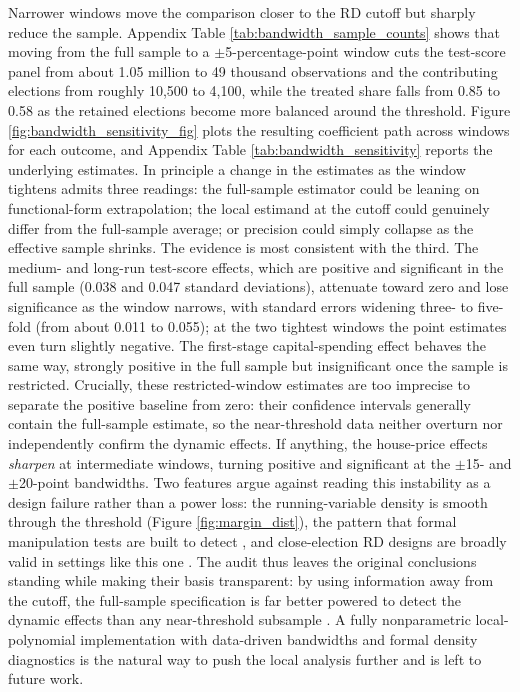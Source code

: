 \documentclass[12pt]{article}
\begin{document}
Narrower windows move the comparison closer to the RD cutoff but sharply reduce the sample. Appendix Table \ref{tab:bandwidth_sample_counts} shows that moving from the full sample to a $\pm$5-percentage-point window cuts the test-score panel from about 1.05 million to 49 thousand observations and the contributing elections from roughly 10,500 to 4,100, while the treated share falls from 0.85 to 0.58 as the retained elections become more balanced around the threshold. Figure \ref{fig:bandwidth_sensitivity_fig} plots the resulting coefficient path across windows for each outcome, and Appendix Table \ref{tab:bandwidth_sensitivity} reports the underlying estimates. In principle a change in the estimates as the window tightens admits three readings: the full-sample estimator could be leaning on functional-form extrapolation; the local estimand at the cutoff could genuinely differ from the full-sample average; or precision could simply collapse as the effective sample shrinks. The evidence is most consistent with the third. The medium- and long-run test-score effects, which are positive and significant in the full sample (0.038 and 0.047 standard deviations), attenuate toward zero and lose significance as the window narrows, with standard errors widening three- to five-fold (from about 0.011 to 0.055); at the two tightest windows the point estimates even turn slightly negative. The first-stage capital-spending effect behaves the same way, strongly positive in the full sample but insignificant once the sample is restricted. Crucially, these restricted-window estimates are too imprecise to separate the positive baseline from zero: their confidence intervals generally contain the full-sample estimate, so the near-threshold data neither overturn nor independently confirm the dynamic effects. If anything, the house-price effects \emph{sharpen} at intermediate windows, turning positive and significant at the $\pm$15- and $\pm$20-point bandwidths. Two features argue against reading this instability as a design failure rather than a power loss: the running-variable density is smooth through the threshold (Figure \ref{fig:margin_dist}), the pattern that formal manipulation tests are built to detect \citep{mccrary2008manipulation,cattaneo2020simple}, and close-election RD designs are broadly valid in settings like this one \citep{eggers2015validity,delacuesta2016misunderstandings}. The audit thus leaves the original conclusions standing while making their basis transparent: by using information away from the cutoff, the full-sample specification is far better powered to detect the dynamic effects than any near-threshold subsample \citep{imbens2012optimal,calonico2014robust}. A fully nonparametric local-polynomial implementation with data-driven bandwidths and formal density diagnostics \citep{calonico2017rdrobust,cattaneo2020simple} is the natural way to push the local analysis further and is left to future work.
\end{document}
